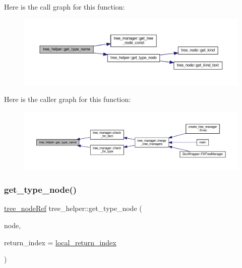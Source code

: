 Here is the call graph for this function\+:
\nopagebreak
\begin{figure}[H]
\begin{center}
\leavevmode
\includegraphics[width=350pt]{d7/d99/classtree__helper_af20cbfb32e0a8e29ce353e57e358b823_cgraph}
\end{center}
\end{figure}
Here is the caller graph for this function\+:
\nopagebreak
\begin{figure}[H]
\begin{center}
\leavevmode
\includegraphics[width=350pt]{d7/d99/classtree__helper_af20cbfb32e0a8e29ce353e57e358b823_icgraph}
\end{center}
\end{figure}
\mbox{\label{classtree__helper_a687cfb8bc559db48750e1ecbc1019bae}} 
\subsubsection{\texorpdfstring{get\+\_\+type\+\_\+node()}{get\_type\_node()}}
{\footnotesize\ttfamily \hyperlink{tree__node_8hpp_a6ee377554d1c4871ad66a337eaa67fd5}{tree\+\_\+node\+Ref} tree\+\_\+helper\+::get\+\_\+type\+\_\+node (\begin{DoxyParamCaption}\item[{const \hyperlink{tree__node_8hpp_a6ee377554d1c4871ad66a337eaa67fd5}{tree\+\_\+node\+Ref} \&}]{node,  }\item[{unsigned int \&}]{return\+\_\+index = {\ttfamily \hyperlink{classtree__helper_a8b5eaad0abef101ef9c92076671efa62}{local\+\_\+return\+\_\+index}} }\end{DoxyParamCaption})\hspace{0.3cm}{\ttfamily [static]}}



